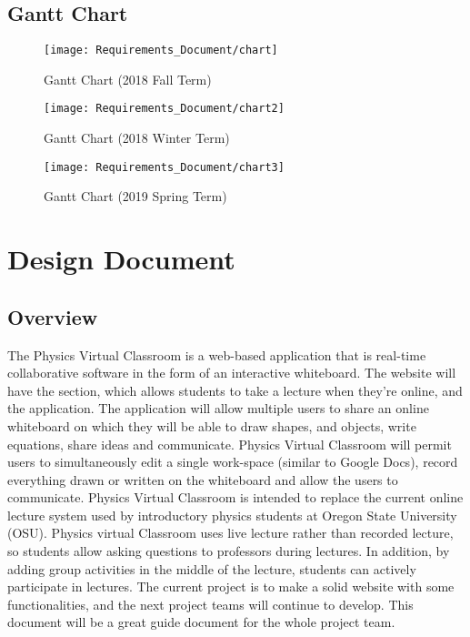 \documentclass[10pt]{article}
\begin{document}
    \subsection{Gantt Chart}
        \begin{figure}[!ht]
        \centering
            \texttt{[image: Requirements\_Document/chart]}
            \caption{Gantt Chart (2018 Fall Term)}
        \end{figure}

         \begin{figure}[!ht]
        \centering
            \texttt{[image: Requirements\_Document/chart2]}
            \caption{Gantt Chart (2018 Winter Term)}
        \end{figure}
    \newpage
        \begin{figure}[!ht]
        \centering
            \texttt{[image: Requirements\_Document/chart3]}
            \caption{Gantt Chart (2019 Spring Term)}
        \end{figure}

\newpage
\section{Design Document}
    \subsection{Overview}
        The Physics Virtual Classroom is a web-based application that is real-time collaborative software in the form of an interactive whiteboard. The website will have the section, which allows students to take a lecture when they’re online, and the application. The application will allow multiple users to share an online whiteboard on which they will be able to draw shapes, and objects, write equations, share ideas and communicate. Physics Virtual Classroom will permit users to simultaneously edit a single work-space (similar to Google Docs), record everything drawn or written on the whiteboard and allow the users to communicate. Physics Virtual Classroom is intended to replace the current online lecture system used by introductory physics students at Oregon State University (OSU). Physics virtual Classroom uses live lecture rather than recorded lecture, so students allow asking questions to professors during lectures. In addition, by adding group activities in the middle of the lecture, students can actively participate in lectures. The current project is to make a solid website with some functionalities, and the next project teams will continue to develop. This document will be a great guide document for the whole project team.
\end{document}
